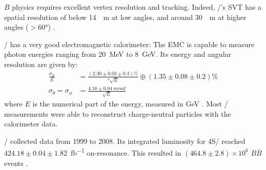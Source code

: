 $B$ physics requires excellent vertex resolution and tracking.
Indeed, \BaBar/'s SVT has a spatial resolution of below \SI{14}{\mu m} at low
angles, and around \SI{30}{\mu m} at higher angles
($> \ang{60}$) \cite{Harrison:1998yr}.

\BaBar/ has a very good electromagnetic calorimeter:
The EMC is capable to measure photon energies ranging from \SI{20}{MeV} to
\SI{8}{GeV}.
Its energy and angular resolution are given by:
\begin{align*}
    \frac{\sigma_E}{E} &= \frac{(2.30 \pm 0.03 \pm 0.3)\%}{^{4}\sqrt{E}}
    \oplus (1.35 \pm 0.08 \pm 0.2)\% \\
    \sigma_{\theta} = \sigma_{\phi} &= \frac{{4.16 \pm 0.04}~\si{mrad}}
        {\sqrt{E}}
\end{align*}
where $E$ is the numerical part of the energy, measured in
\si{GeV} \cite{Bauer:2005}.
Most \BaBar/ measurements were able to reconstruct charge-neutral particles with
the calorimeter data.

\BaBar/ collected data from 1999 to 2008. Its integrated luminosity for \Y4S/
reached $424.18 \pm 0.04 \pm 1.82$~\si{fb^{-1}} on-resonance.
This resulted in $(464.8 \pm 2.8) \times 10^6$ $B \overline{B}$
events \cite{Lees:2013rw}.
